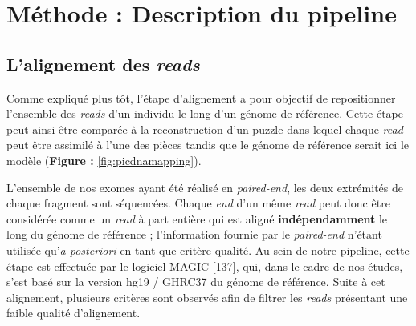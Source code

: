 \documentclass[12pt,a4paper,twoside]{ugathesis}
\theoremstyle{definition}
\theoremstyle{definition}
\theoremstyle{definition}
\theoremstyle{remark}
\begin{document}
\newpage

\section{Méthode : Description du
pipeline}\label{methode-description-du-pipeline}

\subsection{\texorpdfstring{L'alignement des
\emph{reads}}{L'alignement des reads}}\label{lalignement-des-reads}

Comme expliqué plus tôt, l'étape d'alignement a pour objectif de
repositionner l'ensemble des \emph{reads} d'un individu le long d'un
génome de référence. Cette étape peut ainsi être comparée à la
reconstruction d'un puzzle dans lequel chaque \emph{read} peut être
assimilé à l'une des pièces tandis que le génome de référence serait ici
le modèle (\textbf{Figure : }\ref{fig:picdnamapping}).

L'ensemble de nos exomes ayant été réalisé en \emph{paired-end}, les
deux extrémités de chaque fragment sont séquencées. Chaque \emph{end}
d'un même \emph{read} peut donc être considérée comme un \emph{read} à
part entière qui est aligné \textbf{indépendamment} le long du génome de
référence ; l'information fournie par le \emph{paired-end} n'étant
utilisée qu'\emph{a posteriori} en tant que critère qualité. Au sein de
notre pipeline, cette étape est effectuée par le logiciel MAGIC
{[}\protect\hyperlink{ref-Su2014}{137}{]}, qui, dans le cadre de nos
études, s'est basé sur la version hg19 / GHRC37 du génome de référence.
Suite à cet alignement, plusieurs critères sont observés afin de filtrer
les \emph{reads} présentant une faible qualité d'alignement.
\end{document}

